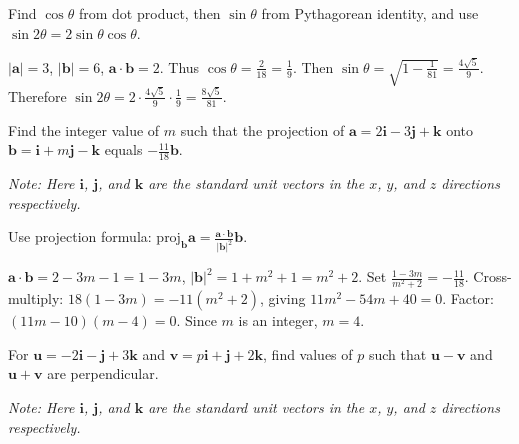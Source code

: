 \begin{hint}
Find $\cos\theta$ from dot product, then $\sin\theta$ from Pythagorean identity, and use $\sin 2\theta = 2\sin\theta\cos\theta$.
\end{hint}

\begin{solution}[Sketch]
$|\mathbf{a}| = 3$, $|\mathbf{b}| = 6$, $\mathbf{a} \cdot \mathbf{b} = 2$. Thus $\cos\theta = \frac{2}{18} = \frac{1}{9}$. Then $\sin\theta = \sqrt{1 - \frac{1}{81}} = \frac{4\sqrt{5}}{9}$. Therefore $\sin 2\theta = 2 \cdot \frac{4\sqrt{5}}{9} \cdot \frac{1}{9} = \frac{8\sqrt{5}}{81}$.
\end{solution}

\vspace{1em}

\begin{problem}
Find the integer value of $m$ such that the projection of $\mathbf{a} = 2\mathbf{i} - 3\mathbf{j} + \mathbf{k}$ onto $\mathbf{b} = \mathbf{i} + m\mathbf{j} - \mathbf{k}$ equals $-\frac{11}{18}\mathbf{b}$.

\textit{Note: Here $\mathbf{i}$, $\mathbf{j}$, and $\mathbf{k}$ are the standard unit vectors in the $x$, $y$, and $z$ directions respectively.}
\end{problem}

\begin{hint}
Use projection formula: $\text{proj}_\mathbf{b}\mathbf{a} = \frac{\mathbf{a} \cdot \mathbf{b}}{|\mathbf{b}|^2}\mathbf{b}$.
\end{hint}

\begin{solution}[Sketch]
$\mathbf{a} \cdot \mathbf{b} = 2 - 3m - 1 = 1 - 3m$, $|\mathbf{b}|^2 = 1 + m^2 + 1 = m^2 + 2$. Set $\frac{1-3m}{m^2+2} = -\frac{11}{18}$. Cross-multiply: $18(1-3m) = -11(m^2+2)$, giving $11m^2 - 54m + 40 = 0$. Factor: $(11m-10)(m-4) = 0$. Since $m$ is an integer, $m = 4$.
\end{solution}

\vspace{1em}

\begin{problem}
For $\mathbf{u} = -2\mathbf{i} - \mathbf{j} + 3\mathbf{k}$ and $\mathbf{v} = p\mathbf{i} + \mathbf{j} + 2\mathbf{k}$, find values of $p$ such that $\mathbf{u} - \mathbf{v}$ and $\mathbf{u} + \mathbf{v}$ are perpendicular.

\textit{Note: Here $\mathbf{i}$, $\mathbf{j}$, and $\mathbf{k}$ are the standard unit vectors in the $x$, $y$, and $z$ directions respectively.}
\end{problem}

